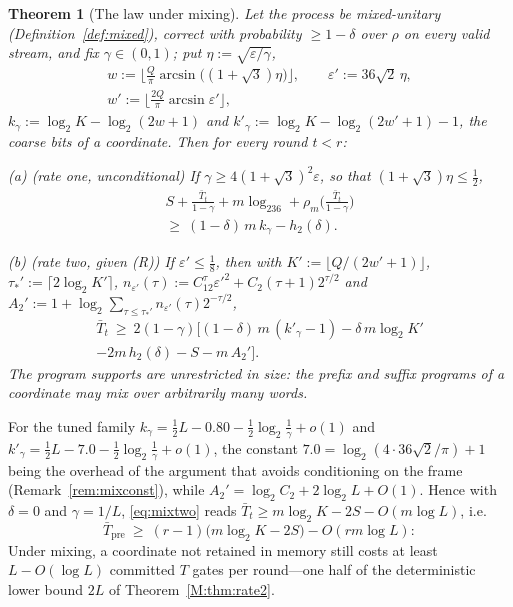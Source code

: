 \documentclass[aps,prx,twocolumn,superscriptaddress,nofootinbib,longbibliography]{revtex4-2}
\theoremstyle{plain}
\newtheorem{theorem}{Theorem}
\theoremstyle{definition}
\theoremstyle{remark}
\newcommand{\Tpre}{T_{\mathrm{pre}}}
\begin{document}
\begin{theorem}[The law under mixing]\label{thm:mixing}
Let the process be mixed-unitary (Definition~\ref{def:mixed}), correct with probability $\ge1-\delta$ over $\rho$ on every valid stream, and fix $\gamma\in(0,1)$; put $\eta:=\sqrt{\varepsilon/\gamma}$,
\[
\begin{gathered}
w:=\Big\lfloor\tfrac Q\pi\arcsin\big((1+\sqrt3)\eta\big)\Big\rfloor,\qquad
\varepsilon':=36\sqrt2\,\eta,\\
w':=\Big\lfloor\tfrac{2Q}\pi\arcsin\varepsilon'\Big\rfloor,
\end{gathered}
\]
$k_\gamma:=\log_2K-\log_2(2w+1)$ and $k'_\gamma:=\log_2K-\log_2(2w'+1)-1$, the \emph{coarse bits} of a coordinate. Then for every round $t<r$:

(a) \emph{(rate one, unconditional)} If $\gamma\ge4(1+\sqrt3)^2\varepsilon$, so that $(1+\sqrt3)\eta\le\tfrac12$,
\begin{multline}\label{eq:mixone}
S+\frac{\bar T_t}{1-\gamma}+m\log_236+\rho_m\!\Big(\frac{\bar T_t}{1-\gamma}\Big)\\ \ge\ (1-\delta)\,m\,k_\gamma-h_2(\delta).
\end{multline}

(b) \emph{(rate two, given (R))} If $\varepsilon'\le\tfrac18$, then with $K':=\lfloor Q/(2w'+1)\rfloor$, $\tau_*':=\lceil2\log_2K'\rceil$, $n_{\varepsilon'}(\tau):=C_12^\tau\varepsilon'^2+C_2(\tau+1)2^{\tau/2}$ and $A_2':=1+\log_2\sum_{\tau\le\tau_*'}n_{\varepsilon'}(\tau)2^{-\tau/2}$,
\begin{multline}\label{eq:mixtwo}
\bar T_t\ \ge\ 2(1-\gamma)\big[(1-\delta)\,m\,(k'_\gamma-1)-\delta\,m\log_2K'\\-2m\,h_2(\delta)-S-m\,A_2'\big].
\end{multline}
The program supports are unrestricted in size: the prefix and suffix programs of a coordinate may mix over arbitrarily many words.
\end{theorem}
For the tuned family $k_\gamma=\tfrac12L-0.80-\tfrac12\log_2\tfrac1\gamma+o(1)$ and $k'_\gamma=\tfrac12L-7.0-\tfrac12\log_2\tfrac1\gamma+o(1)$, the constant $7.0=\log_2(4\cdot36\sqrt2/\pi)+1$ being the overhead of the argument that avoids conditioning on the frame (Remark~\ref{rem:mixconst}), while $A_2'=\log_2C_2+2\log_2L+O(1)$. Hence with $\delta=0$ and $\gamma=1/L$, \eqref{eq:mixtwo} reads $\bar T_t\ge m\log_2K-2S-O(m\log L)$, i.e.
\begin{equation}\label{eq:mixfloor}
\bar\Tpre\ \ge\ (r-1)\big(m\log_2K-2S\big)-O(rm\log L):
\end{equation}
Under mixing, a coordinate not retained in memory still costs at least $L-O(\log L)$ committed $T$ gates per round---one half of the deterministic lower bound $2L$ of Theorem~\ref{M:thm:rate2}.
\end{document}
